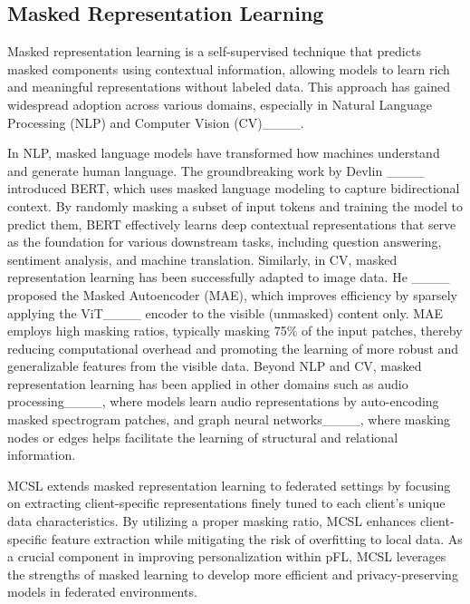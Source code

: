 \subsection{Masked Representation Learning} 
Masked representation learning is a self-supervised technique that predicts masked components using contextual information, allowing models to learn rich and meaningful representations without labeled data. This approach has gained widespread adoption across various domains, especially in Natural Language Processing (NLP) and Computer Vision (CV)____.

In NLP, masked language models have transformed how machines understand and generate human language. The groundbreaking work by Devlin \etal____ introduced BERT, which uses masked language modeling to capture bidirectional context. By randomly masking a subset of input tokens and training the model to predict them, BERT effectively learns deep contextual representations that serve as the foundation for various downstream tasks, including question answering, sentiment analysis, and machine translation. Similarly, in CV, masked representation learning has been successfully adapted to image data. He \etal____ proposed the Masked Autoencoder (MAE), which improves efficiency by sparsely applying the ViT____ encoder to the visible (unmasked) content only. MAE employs high masking ratios, typically masking 75\% of the input patches, thereby reducing computational overhead and promoting the learning of more robust and generalizable features from the visible data. Beyond NLP and CV, masked representation learning has been applied in other domains such as audio processing____, where models learn audio representations by auto-encoding masked spectrogram patches, and graph neural networks____, where masking nodes or edges helps facilitate the learning of structural and relational information.

MCSL extends masked representation learning to federated settings by focusing on extracting client-specific representations finely tuned to each client’s unique data characteristics. By utilizing a proper masking ratio, MCSL enhances client-specific feature extraction while mitigating the risk of overfitting to local data. As a crucial component in improving personalization within pFL, MCSL leverages the strengths of masked learning to develop more efficient and privacy-preserving models in federated environments.